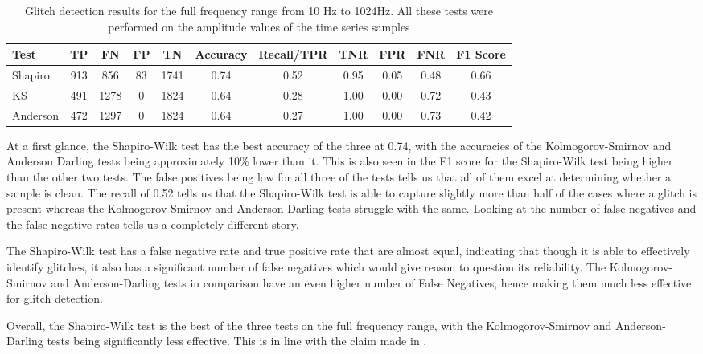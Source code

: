 \documentclass[12pt]{article}
\begin{document}
\begin{table}[H]
  \centering
  \begin{tabular}{lcccccccccc}
  \toprule
  Test & TP & FN & FP & TN & Accuracy & Recall/TPR & TNR & FPR & FNR & F1 Score \\
  \midrule
  Shapiro & 913 & 856 & 83 & 1741 & 0.74 & 0.52 & 0.95 & 0.05 & 0.48 & 0.66 \\
  KS & 491 & 1278 & 0 & 1824 & 0.64 & 0.28 & 1.00 & 0.00 & 0.72 & 0.43 \\
  Anderson & 472 & 1297 & 0 & 1824 & 0.64 & 0.27 & 1.00 & 0.00 & 0.73 & 0.42 \\
  \bottomrule
  \end{tabular}
  \caption{Glitch detection results for the full frequency range from 10 Hz to 1024Hz. All these tests were performed on the amplitude values of the time series samples}
  \label{tab:full_range_results}
\end{table}

\noindent At a first glance, the Shapiro-Wilk test has the best accuracy of the three at 0.74, with the accuracies of the Kolmogorov-Smirnov and Anderson Darling tests being approximately 10\% lower than it. This is also seen in the F1 score for the Shapiro-Wilk test being higher than the other two tests. The false positives being low for all three of the tests tells us that all of them excel at determining whether a sample is clean. The recall of 0.52 tells us that the Shapiro-Wilk test is able to capture slightly more than half of the cases where a glitch is present whereas the Kolmogorov-Smirnov and Anderson-Darling tests struggle with the same. Looking at the number of false negatives and the false negative rates tells us a completely different story.

\medskip
\noindent The Shapiro-Wilk test has a false negative rate and true positive rate that are almost equal, indicating that though it is able to effectively identify glitches, it also has a significant number of false negatives which would give reason to question its reliability. The Kolmogorov-Smirnov and Anderson-Darling tests in comparison have an even higher number of False Negatives, hence making them much less effective for glitch detection.

\medskip
\noindent Overall, the Shapiro-Wilk test is the best of the three tests on the full frequency range, with the Kolmogorov-Smirnov and Anderson-Darling tests being significantly less effective. This is in line with the claim made in \cite{razali2011power}.
\end{document}
